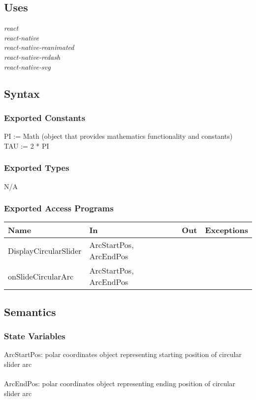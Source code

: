 \documentclass[12pt, titlepage]{article}
\begin{document}
\subsection{Uses}
{\textit{react}}\\
{\textit{react-native}}\\
{\textit{react-native-reanimated}}\\
{\textit{react-native-redash}}\\
{\textit{react-native-svg}}

\subsection{Syntax}

\subsubsection{Exported Constants}
PI := Math (object that provides mathematics functionality and constants)\\
TAU := 2 * PI

\subsubsection{Exported Types}
N/A

\subsubsection{Exported Access Programs}

\begin{tabular}{| l | l | l | l |}
	\hline
	{\textbf{Name}} & {\textbf{In}} & {\textbf{Out}} & {\textbf{Exceptions}}\\
	\hline
	{DisplayCircularSlider} & ArcStartPos, ArcEndPos & & \\
	\hline
	{onSlideCircularArc} & ArcStartPos, ArcEndPos & & \\
	\hline
\end{tabular}

\subsection{Semantics}

\subsubsection{State Variables}
ArcStartPos: polar coordinates object representing starting position of circular slider arc\\\\
ArcEndPos: polar coordinates object representing ending position of circular slider arc
\end{document}
